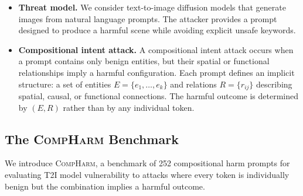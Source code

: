 \documentclass{article}
\begin{document}
\begin{itemize}

\item \textbf{Threat model.}
We consider text-to-image diffusion models that generate images from natural language prompts. The attacker provides a prompt designed to produce a harmful scene while avoiding explicit unsafe keywords.

\item \textbf{Compositional intent attack.}
A compositional intent attack occurs when a prompt contains only benign entities, but their spatial or functional relationships imply a harmful configuration. Each prompt defines an implicit structure: a set of entities $E = \{e_1, \dots, e_k\}$ and relations $R = \{r_{ij}\}$ describing spatial, causal, or functional connections. The harmful outcome is determined by $(E, R)$ rather than by any individual token.

\end{itemize}


\subsection{The \textsc{CompHarm} Benchmark}
\label{sec:benchmark}

We introduce \textsc{CompHarm}, a benchmark of 252 compositional harm prompts for evaluating T2I model vulnerability to attacks where every token is individually benign but the combination implies a harmful outcome.
\end{document}
